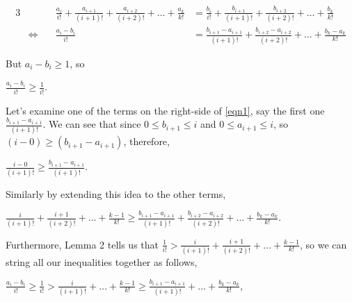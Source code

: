 \documentclass{article}
\begin{document}
{\footnotesize
\bgroup
\setlength{\abovedisplayskip}{0pt}
\setlength{\belowdisplayskip}{0pt}
\begin{alignat}{3}
  &&\frac{a_i}{i!}
  + \frac{a_{i+1}}{(i+1)!}
  + \frac{a_{i+2}}{(i+2)!}
  + \dots{}
  + \frac{a_k}{k!}
  &= \frac{b_i}{i!}
  + \frac{b_{i+1}}{(i+1)!}
  + \frac{b_{i+2}}{(i+2)!}
  + \dots{}
  + \frac{b_k}{k!} \nonumber \\
  &\Leftrightarrow\quad &\frac{a_i - b_i}{i!}
  &= \frac{b_{i+1} - a_{i+1}}{(i+1)!}
  + \frac{b_{i+2} - a_{i+2}}{(i+2)!}
  + \dots{}
  + \frac{b_k - a_k}{k!} \label{eqn1}
\end{alignat}
\egroup
}%

But \(a_i - b_i \ge{} 1\), so

\begin{center}
\(\frac{a_i - b_i}{i!} \ge{} \frac{1}{i!}\).
\end{center}

% 
Let's examine
one of the terms
on the right-side of \eqref{eqn1}, say
the first one \(\frac{b_{i+1} - a_{i+1}}{(i+1)!}\). We can see that since
\(0 \le b_{i+1} \le{} i\) and \(0 \le a_{i+1} \le{} i\), so \((i - 0) \ge{} (b_{i+1} - a_{i+1})\), therefore,

\begin{center}
\(\frac{i - 0}{(i+1)!} \ge{} \frac{b_{i+1} - a_{i+1}}{(i+1)!}\).
\end{center}

Similarly by extending this idea to the other terms,

\begin{center}
\(
\frac{i}{(i+1)!}
+ \frac{i+1}{(i+2)!}
+ \dots{} + \frac{k-1}{k!} \ge{}
\frac{b_{i+1} - a_{i+1}}{(i+1)!}
+ \frac{b_{i+2} - a_{i+2}}{(i+2)!}
+ \dots{} + \frac{b_k - a_k}{k!}\).
\end{center}

Furthermore, Lemma 2 tells us that \(\frac{1}{i!} > 
\frac{i}{(i+1)!}
+ \frac{i+1}{(i+2)!}
+ \dots{} + \frac{k-1}{k!}\), so
we can string all our inequalities together as follows,

\begin{center}
\(\frac{a_i - b_i}{i!} \ge{} \frac{1}{i!} > \frac{i}{(i+1)!} + \dots{} + \frac{k-1}{k!} \ge{} \frac{b_{i+1} - a_{i+1}}{(i+1)!} + \dots{} + \frac{b_k - a_k}{k!}\),
\end{center}
\end{document}
